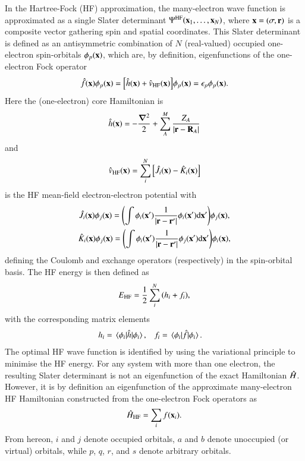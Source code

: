 \documentclass[aps,prb,reprint,noshowkeys,linenumbers,superscriptaddress]{revtex4-1}
\newcommand{\Ne}{N} %
\newcommand{\hH}{\Hat{H}}
\begin{document}
In the Hartree-Fock (HF) approximation, the many-electron wave function is approximated as a single Slater determinant $\Psi^{\text{HF}}(\vb{x}_1,\ldots,\vb{x}_N)$, where $\vb{x} = (\sigma,\vb{r})$ is a composite vector gathering spin and spatial coordinates.
This Slater determinant is defined as an antisymmetric combination of $\Ne$ (real-valued) occupied one-electron spin-orbitals $\phi_p(\vb{x})$, which are, by definition, eigenfunctions of the one-electron Fock operator 
\begin{equation}\label{eq:FockOp}
    \Hat{f}(\vb{x}) \phi_p(\vb{x}) = \qty[ \Hat{h}(\vb{x}) + \Hat{v}_\text{HF}(\vb{x}) ] \phi_p(\vb{x}) = \epsilon_p \phi_p(\vb{x}).
\end{equation}
Here the (one-electron) core Hamiltonian is
\begin{equation}
\label{eq:Hcore}
	\Hat{h}(\vb{x}) = -\frac{\grad^2}{2} + \sum_{A}^{M} \frac{Z_A}{\abs{\vb{r}-\vb{R}_A}}
\end{equation}
and
\begin{equation}
    \Hat{v}_\text{HF}(\vb{x}) = \sum_i^{N} \qty[ \Hat{J}_i(\vb{x}) - \Hat{K}_i(\vb{x}) ]
\end{equation}
is the HF mean-field electron-electron potential with 
\begin{subequations}
\begin{gather}
	\label{eq:CoulOp}
    \Hat{J}_i(\vb{x})\phi_j(\vb{x})=\qty(\int \phi_i(\vb{x}')\frac{1}{\abs{\vb{r} - \vb{r}'}}\phi_i(\vb{x}') \dd\vb{x}' ) \phi_j(\vb{x}),
	\\
	\label{eq:ExcOp}
\Hat{K}_i(\vb{x})\phi_j(\vb{x})=\qty(\int \phi_i(\vb{x}')\frac{1}{\abs{\vb{r} - \vb{r}'}}\phi_j(\vb{x}') \dd\vb{x}')\phi_i(\vb{x}),
\end{gather}
\end{subequations}
defining the Coulomb and exchange operators (respectively) in the spin-orbital basis.\cite{SzaboBook}
The HF energy is then defined as 
\begin{equation}
    \label{eq:E_HF}
    E_\text{HF} = \frac{1}{2} \sum_i^{N} \qty( h_i + f_i ),
\end{equation}
with the corresponding matrix elements
\begin{align}
	h_i & = \mel{\phi_i}{\Hat{h}}{\phi_i},
    & 
    f_i & = \mel{\phi_i}{\Hat{f}}{\phi_i}.
\end{align}
The optimal HF wave function is identified by using the variational principle to minimise the HF energy.
For any system with more than one electron, the resulting Slater determinant is not an eigenfunction of the exact Hamiltonian $\hH$. 
However, it is by definition an eigenfunction of the approximate many-electron HF Hamiltonian constructed 
from the one-electron Fock operators as
\begin{equation}\label{eq:HFHamiltonian}
	\hH_{\text{HF}} = \sum_{i} f(\vb{x}_i).
\end{equation}
From hereon, $i$ and $j$ denote occupied orbitals, $a$ and $b$ denote unoccupied (or virtual) orbitals, while $p$, $q$, $r$, and $s$ denote arbitrary orbitals.
\end{document}
